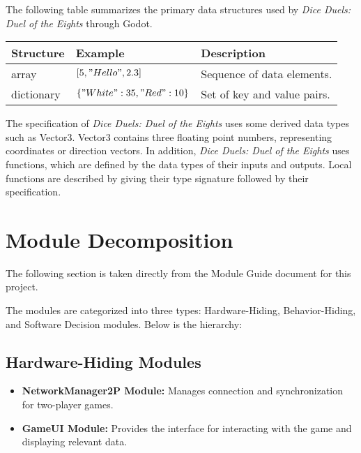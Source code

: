 \documentclass[12pt, titlepage]{article}
\begin{document}
The following table summarizes the primary data structures used by \textit{Dice Duels: Duel of the Eights} through Godot.

\begin{center}
\renewcommand{\arraystretch}{1.2}
\noindent 
\begin{tabular}{l l l} 
\toprule 
\textbf{Structure} & \textbf{Example} & \textbf{Description}\\ 
\midrule
array & $[5, "Hello", 2.3]$ & Sequence of data elements.\\
dictionary & $\{"White": 35, "Red": 10\}$ & Set of key and value pairs.\\
\bottomrule
\end{tabular} 
\end{center}

\noindent
The specification of \textit{Dice Duels: Duel of the Eights} uses some derived data types such as Vector3. Vector3 contains three floating point numbers, representing coordinates or direction vectors. In addition, \textit{Dice Duels: Duel of the Eights} uses functions, which are defined by the data types of their inputs and outputs. Local functions are described by giving their type signature followed by their specification.

\section{Module Decomposition}

The following section is taken directly from the Module Guide document for this project.

The modules are categorized into three types: Hardware-Hiding, Behavior-Hiding, and Software Decision modules. Below is the hierarchy:

\subsection{Hardware-Hiding Modules}
\begin{itemize}
    \item \textbf{NetworkManager2P Module:} Manages connection and synchronization for two-player games.
    \item \textbf{GameUI Module:} Provides the interface for interacting with the game and displaying relevant data.
\end{itemize}
\end{document}
